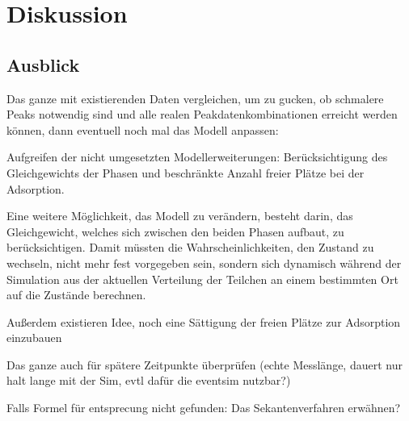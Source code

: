 \chapter{Diskussion}
\label{chapter:dis}

\section{Ausblick}

Das ganze mit existierenden Daten vergleichen, um zu gucken, ob schmalere Peaks notwendig sind und alle realen Peakdatenkombinationen erreicht werden können, dann eventuell noch mal das Modell anpassen:

Aufgreifen der nicht umgesetzten Modellerweiterungen: Berücksichtigung des Gleichgewichts der Phasen und beschränkte Anzahl freier Plätze bei der Adsorption.

Eine weitere Möglichkeit, das Modell zu verändern, besteht darin, das Gleichgewicht, welches sich zwischen den beiden Phasen aufbaut, zu berücksichtigen. Damit müssten die Wahrscheinlichkeiten, den Zustand zu wechseln, nicht mehr fest vorgegeben sein, sondern sich dynamisch während der Simulation aus der aktuellen Verteilung der Teilchen an einem bestimmten Ort auf die Zustände berechnen.

Außerdem existieren Idee, noch eine Sättigung der freien Plätze zur Adsorption einzubauen

Das ganze auch für spätere Zeitpunkte überprüfen (echte Messlänge, dauert nur halt lange mit der Sim, evtl dafür die eventsim nutzbar?)


Falls Formel für entsprecung nicht gefunden: Das Sekantenverfahren erwähnen?

